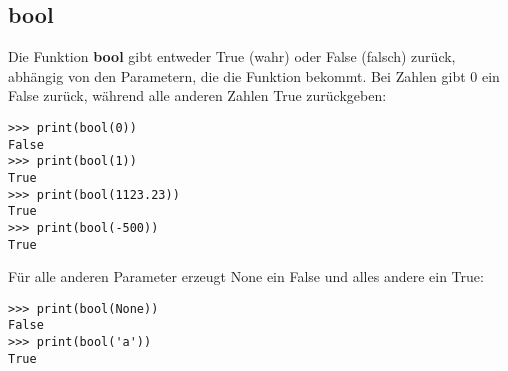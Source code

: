 \subsection*{bool}

Die Funktion \textbf{bool} gibt entweder True (wahr) oder False (falsch) zurück, abhängig von den Parametern, die die Funktion bekommt. Bei Zahlen gibt 0 ein False zurück, während alle anderen Zahlen True zurückgeben:

\begin{Verbatim}[frame=single]
>>> print(bool(0))
False
>>> print(bool(1))
True
>>> print(bool(1123.23))
True
>>> print(bool(-500))
True
\end{Verbatim}

Für alle anderen Parameter erzeugt None ein False und alles andere ein True:

\begin{Verbatim}[frame=single]
>>> print(bool(None))
False
>>> print(bool('a'))
True
\end{Verbatim}




